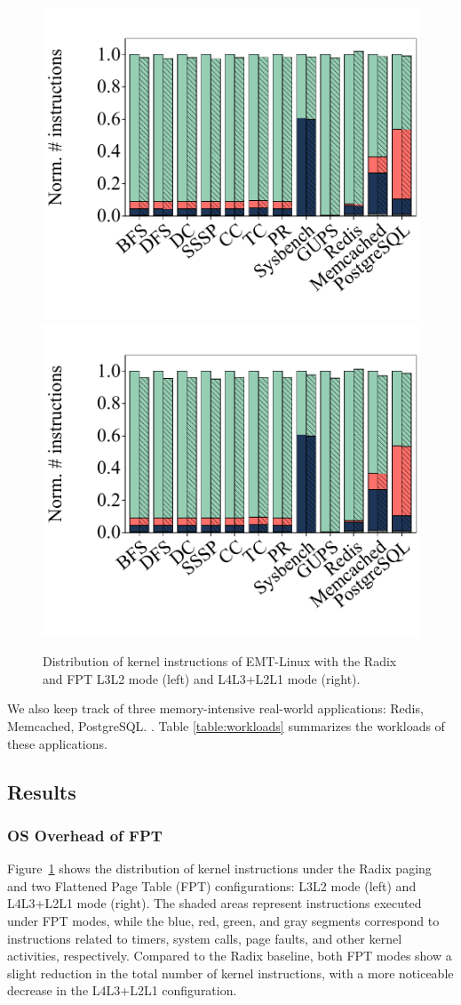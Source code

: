 \begin{figure}
    \centering
    \includegraphics[width=0.495\linewidth]{graph/kern_inst_unified_never_L3L2.pdf} \includegraphics[width=0.495\linewidth]{graph/kern_inst_unified_never_L4L3L2L1.pdf}
    \caption{Distribution of kernel instructions of EMT-Linux with the Radix and FPT L3L2 mode (left) and L4L3+L2L1 mode (right).}
    \label{fig:kernel_inst}
\end{figure}

We also keep track of three memory-intensive real-world applications:
    Redis,
    Memcached,
    PostgreSQL. \cite{redis,memcached,postgresql}.
Table \ref{table:workloads} summarizes the workloads of these applications.


\subsection{Results}

\subsubsection{OS Overhead of FPT}

Figure~\ref{fig:kernel_inst} shows the distribution of kernel instructions under the Radix paging and two Flattened Page Table (FPT) configurations: L3L2 mode (left) and L4L3+L2L1 mode (right). The shaded areas represent instructions executed under FPT modes, while the blue, red, green, and gray segments correspond to instructions related to timers, system calls, page faults, and other kernel activities, respectively. Compared to the Radix baseline, both FPT modes show a slight reduction in the total number of kernel instructions, with a more noticeable decrease in the L4L3+L2L1 configuration.

